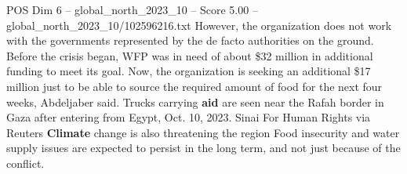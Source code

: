 \begin{textsample}{POS Dim 6 – global\_north\_2023\_10 – Score 5.00 – global\_north\_2023\_10/102596216.txt}
However, the organization does not work with the governments represented by the de facto authorities on the ground.
Before the crisis began, WFP was in need of about \$32 million in additional funding to meet its goal.
Now, the organization is seeking an additional \$17 million just to be able to source the required amount of food for the next four weeks, Abdeljaber said.
Trucks carrying \textbf{aid} are seen near the Rafah border in Gaza after entering from Egypt, Oct. 10, 2023.
Sinai For Human Rights via Reuters \textbf{Climate} change is also threatening the region Food insecurity and water supply issues are expected to persist in the long term, and not just because of the conflict.

\end{textsample}
